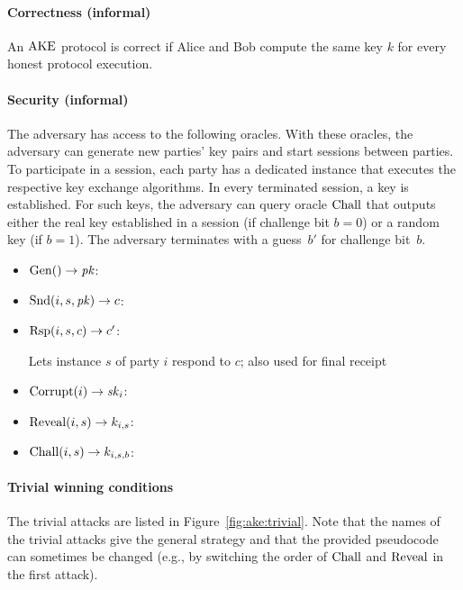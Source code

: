 \paragraph{Correctness (informal)}
An $\mathrm{AKE}$ protocol is correct if Alice and Bob compute the same key $k$ for every honest protocol execution.

\paragraph{Security (informal)}
The adversary has access to the following oracles.
With these oracles, the adversary can generate new parties' key pairs and start sessions between parties.
To participate in a session, each party has a dedicated instance that executes the respective key exchange algorithms.
In every terminated session, a key is established.
For such keys, the adversary can query oracle $\mathrm{Chall}$ that outputs either the real key established in a session (if challenge bit $b=0$) or a random key (if $b=1$).
The adversary terminates with a guess~$b'$ for challenge bit~$b$.

\setlength\itemizeskip{3.5cm}
\begin{itemize}
    \item $\mathrm{Gen}() \to \mathit{pk}$:\hfill{}
    \item $\mathrm{Snd}(i, s, \mathit{pk}) \to c$:\hfill{}
    \item $\mathrm{Rsp}(i,s,c)\to c'$:\hfill\parbox[t][][l]{\linewidth-\itemizeskip}{Lets instance $s$ of party $i$ respond to $c$; also used for final receipt}
    \item $\mathrm{Corrupt}(i)\to\mathit{sk}_i$:\hfill{}
    \item $\mathrm{Reveal}(i,s)\to k_{i,s}$:\hfill{} 
    \item $\mathrm{Chall}(i,s)\to k_{i,s,b}$:\hfill{}
\end{itemize}

\paragraph{Trivial winning conditions}
The trivial attacks are listed in Figure~\ref{fig:ake:trivial}. 
Note that the names of the trivial attacks give the general strategy and that the provided pseudocode can sometimes be changed (e.g., by switching the order of $\mathrm{Chall}$ and $\mathrm{Reveal}$ in the first attack).

